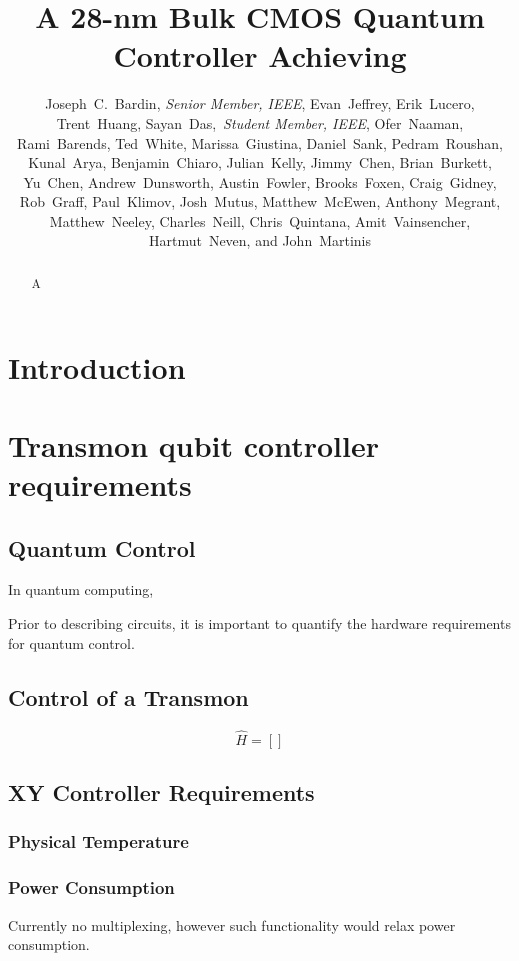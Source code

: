 \documentclass{IEEEtran}
\begin{document}
\title{A 28-nm Bulk CMOS Quantum Controller Achieving }
\author{Joseph~C.~Bardin, \emph{Senior Member, IEEE}, Evan~Jeffrey, Erik~Lucero, Trent~Huang, Sayan~Das,~\emph{Student Member, IEEE}, Ofer~Naaman, Rami~Barends, Ted~White, Marissa~Giustina, Daniel~Sank, Pedram~Roushan, Kunal~Arya, Benjamin~Chiaro, Julian~Kelly, Jimmy~Chen, Brian~Burkett, Yu~Chen, Andrew~Dunsworth, Austin~Fowler, Brooks~Foxen, Craig~Gidney, Rob~Graff, Paul~Klimov, Josh~Mutus, Matthew~McEwen, Anthony~Megrant, Matthew~Neeley, Charles~Neill, Chris~Quintana, Amit~Vainsencher, Hartmut~Neven, and John~Martinis}
\maketitle
\begin{abstract}
A
\end{abstract}

\section{Introduction}

\section{Transmon qubit controller requirements}
\subsection{Quantum Control}
In quantum computing, 

Prior to describing circuits, it is important to quantify the hardware requirements for quantum control. 

\subsection{Control of a Transmon}

\begin{equation}
\hat{H}=\left[\right]
\end{equation}
\subsection{XY Controller Requirements}
\subsubsection{Physical Temperature}
\subsubsection{Power Consumption}
Currently no multiplexing, however such functionality would relax power consumption.
\end{document}
